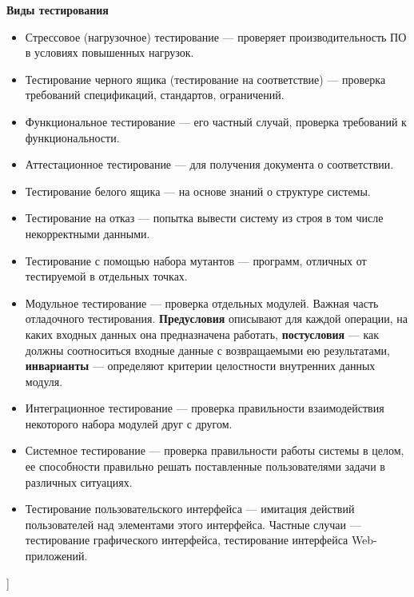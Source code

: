 \textbf{Виды тестирования}

\begin{itemize}
    \item Стрессовое (нагрузочное) тестирование --- проверяет производительность ПО в условиях повышенных нагрузок.
    \item Тестирование черного ящика (тестирование на соответствие) --- проверка требований спецификаций, стандартов, ограничений.
    \item Функциональное тестирование --- его частный случай, проверка требований к функциональности.
    \item Аттестационное тестирование --- для получения документа о соответствии.
    \item Тестирование белого ящика --- на основе знаний о структуре системы.
    \item Тестирование на отказ --- попытка вывести систему из строя в том числе некорректными данными.
    \item Тестирование с помощью набора мутантов --- программ, отличных от тестируемой в отдельных точках.
    \item Модульное тестирование --- проверка отдельных модулей. 
    Важная часть отладочного тестирования.
    \textbf{Предусловия} описывают для каждой операции, на каких входных данных она предназначена работать, \textbf{постусловия} --- как должны соотноситься входные данные с возвращаемыми ею результатами, \textbf{инварианты} --- определяют критерии целостности внутренних данных модуля.
    \item Интеграционное тестирование --- проверка правильности взаимодействия некоторого набора модулей друг с другом.
    \item Системное тестирование --- проверка правильности работы системы в целом, ее способности правильно решать поставленные пользователями задачи в различных ситуациях.
    \item Тестирование пользовательского интерфейса --- имитация действий пользователей над элементами этого интерфейса. Частные случаи --- тестирование графического интерфейса, тестирование интерфейса Web-приложений.
\end{itemize}
\bigbreak
[\cite[page 69-96]{replace_me}]